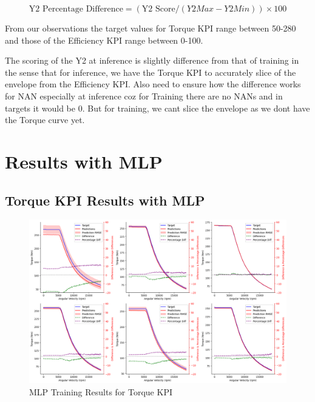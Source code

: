 \documentclass{report} %
\begin{document}
\begin{equation}
    \text{Y2 Percentage Difference} = (\text{Y2 Score} / {(Y2 Max - Y2 Min)})  \times 100
    \label{eq:Y2 Percentage Difference}
\end{equation}

From our observations the target values for Torque \ac{KPI} range between 50-280 and those of the Efficiency \ac{KPI} range between 0-100.

The scoring of the Y2 at inference is slightly difference from that of training in the sense that for inference, we have the Torque \ac{KPI} to 
accurately slice of the envelope from the Efficiency \ac{KPI}. Also need to ensure how the difference works for NAN especially at inference coz 
for Training there are no NANs and in targets it would be 0. But for training, we cant slice the envelope as we dont have the Torque curve yet.

\section{Results with \ac{MLP}}\label{sec:Results with MLP}

\subsection{Torque \ac{KPI} Results with \ac{MLP}}\label{sec:2D Torque Curve Results with MLP}

\begin{figure}[H]
    \centering
    \includegraphics[width=1\textwidth]{./ReportImages/KPI2D_predictions.png} 
    \caption{MLP Training Results for Torque \ac{KPI}} 
    \label{fig:MLP Training Results for 2D KPI(Torque)}
\end{figure}
\end{document}
